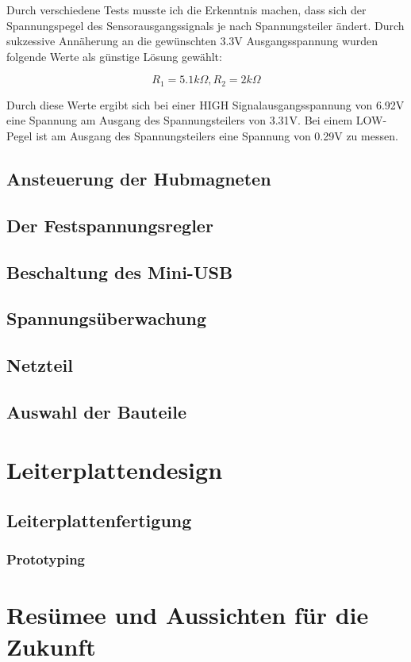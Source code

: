 Durch verschiedene Tests musste ich die Erkenntnis machen, dass sich der Spannungspegel des Sensorausgangssignals je nach Spannungsteiler ändert.
Durch sukzessive Annäherung an die gewünschten 3.3V Ausgangsspannung wurden folgende Werte als günstige Lösung gewählt:

\begin{equation*}
    R_1 = 5.1k\Omega, R_2 = 2k\Omega
\end{equation*}

Durch diese Werte ergibt sich bei einer HIGH Signalausgangsspannung von 6.92V eine Spannung am Ausgang des Spannungsteilers von 3.31V.
Bei einem LOW-Pegel ist am Ausgang des Spannungsteilers eine Spannung von 0.29V zu messen.


\subsection{Ansteuerung der Hubmagneten}

\subsection{Der Festspannungsregler}

\subsection{Beschaltung des Mini-USB}

\subsection{Spannungsüberwachung}

\subsection{Netzteil}


\subsection{Auswahl der Bauteile}


\section{Leiterplattendesign}

\subsection{Leiterplattenfertigung}

\subsubsection{Prototyping}

\section{Resümee und Aussichten für die Zukunft}
